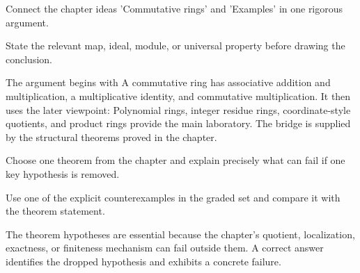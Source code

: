 \begin{exercise}\label{exr:v01-expand-15}
Connect the chapter ideas 'Commutative rings' and 'Examples' in one rigorous argument.
\end{exercise}
\begin{hint}
State the relevant map, ideal, module, or universal property before drawing the conclusion.
\end{hint}
\begin{solution}
The argument begins with A commutative ring has associative addition and multiplication, a multiplicative identity, and commutative multiplication. It then uses the later viewpoint: Polynomial rings, integer residue rings, coordinate-style quotients, and product rings provide the main laboratory. The bridge is supplied by the structural theorems proved in the chapter.
\end{solution}

\begin{exercise}\label{exr:v01-expand-16}
Choose one theorem from the chapter and explain precisely what can fail if one key hypothesis is removed.
\end{exercise}
\begin{hint}
Use one of the explicit counterexamples in the graded set and compare it with the theorem statement.
\end{hint}
\begin{solution}
The theorem hypotheses are essential because the chapter's quotient, localization, exactness, or finiteness mechanism can fail outside them. A correct answer identifies the dropped hypothesis and exhibits a concrete failure.
\end{solution}

